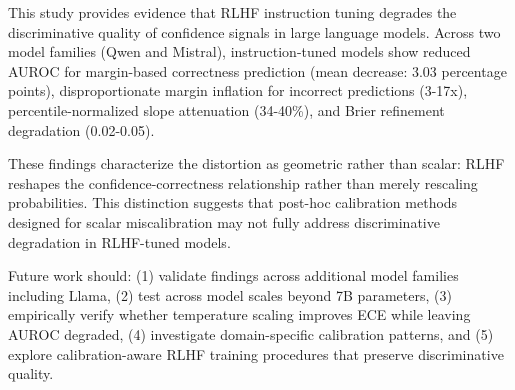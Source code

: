 
This study provides evidence that RLHF instruction tuning degrades the discriminative quality of confidence signals in large language models. Across two model families (Qwen and Mistral), instruction-tuned models show reduced AUROC for margin-based correctness prediction (mean decrease: 3.03 percentage points), disproportionate margin inflation for incorrect predictions (3-17x), percentile-normalized slope attenuation (34-40\%), and Brier refinement degradation (0.02-0.05).

These findings characterize the distortion as geometric rather than scalar: RLHF reshapes the confidence-correctness relationship rather than merely rescaling probabilities. This distinction suggests that post-hoc calibration methods designed for scalar miscalibration may not fully address discriminative degradation in RLHF-tuned models.

Future work should: (1) validate findings across additional model families including Llama, (2) test across model scales beyond 7B parameters, (3) empirically verify whether temperature scaling improves ECE while leaving AUROC degraded, (4) investigate domain-specific calibration patterns, and (5) explore calibration-aware RLHF training procedures that preserve discriminative quality.
